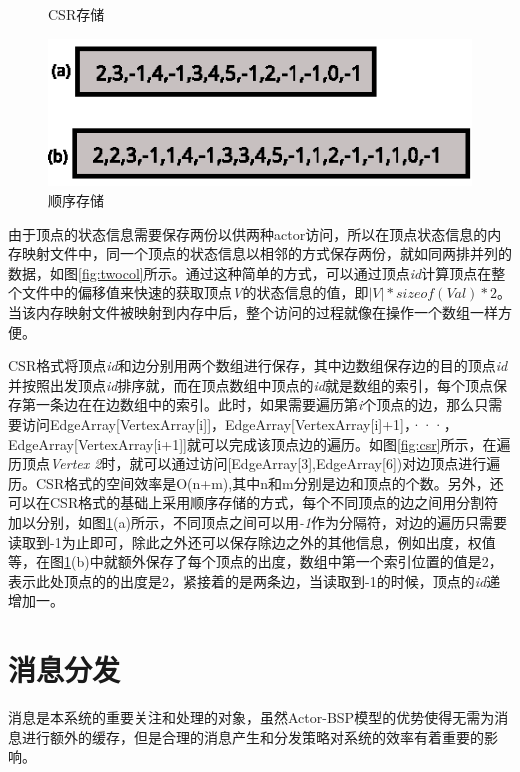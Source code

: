 \begin{figure}[htbp]
\begin{minipage}{0.4\textwidth}
\caption{CSR存储}\label{fig:csr}
\end{minipage}
\begin{minipage}{0.4\textwidth}
\centering
\includegraphics[width=\textwidth]{myfigures/ncsr.eps}
\caption{顺序存储}\label{fig:ncsr}
\end{minipage}

\vspace{\baselineskip}
\end{figure}

由于顶点的状态信息需要保存两份以供两种actor访问，所以在顶点状态信息的内存映射文件中，同一个顶点的状态信息以相邻的方式保存两份，就如同两排并列的数据，如图\ref{fig:twocol}所示。通过这种简单的方式，可以通过顶点\textit{id}计算顶点在整个文件中的偏移值来快速的获取顶点\textit{V}的状态信息的值，即$|V| * sizeof(Val)*2$。当该内存映射文件被映射到内存中后，整个访问的过程就像在操作一个数组一样方便。

CSR格式将顶点\textit{id}和边分别用两个数组进行保存，其中边数组保存边的目的顶点\textit{id}并按照出发顶点\textit{id}排序就，而在顶点数组中顶点的\textit{id}就是数组的索引，每个顶点保存第一条边在在边数组中的索引。此时，如果需要遍历第\textit{i}个顶点的边，那么只需要访问EdgeArray[VertexArray[i]]，EdgeArray[VertexArray[i]+1]，···，EdgeArray[VertexArray[i+1]]就可以完成该顶点边的遍历。如图\ref{fig:csr}所示，在遍历顶点\textit{Vertex 2}时，就可以通过访问[EdgeArray[3],EdgeArray[6])对边顶点进行遍历。CSR格式的空间效率是O(n+m),其中n和m分别是边和顶点的个数。另外，还可以在CSR格式的基础上采用顺序存储的方式，每个不同顶点的边之间用分割符加以分别，如图\ref{fig:ncsr}(a)所示，不同顶点之间可以用\textit{-1}作为分隔符，对边的遍历只需要读取到-1为止即可，除此之外还可以保存除边之外的其他信息，例如出度，权值等，在图\ref{fig:ncsr}(b)中就额外保存了每个顶点的出度，数组中第一个索引位置的值是2，表示此处顶点的的出度是2，紧接着的是两条边，当读取到-1的时候，顶点的\textit{id}递增加一。

\section{消息分发}
消息是本系统的重要关注和处理的对象，虽然Actor-BSP模型的优势使得无需为消息进行额外的缓存，但是合理的消息产生和分发策略对系统的效率有着重要的影响。
